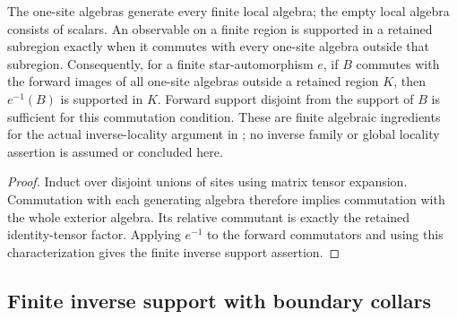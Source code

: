 \begin{lemma}
    \label{lem:mpu_singleton_generation_and_inverse_reflection}
    \leanok
    The one-site algebras generate every finite local algebra; the empty
    local algebra consists of scalars. An observable on a finite region
    is supported in a retained subregion exactly when it commutes with
    every one-site algebra outside that subregion. Consequently, for a
    finite star-automorphism $e$, if $B$ commutes with the forward images
    of all one-site algebras outside a retained region $K$, then
    $e^{-1}(B)$ is supported in $K$. Forward support disjoint from the
    support of $B$ is sufficient for this commutation condition. These
    are finite algebraic ingredients for the actual inverse-locality
    argument in \cite[lines~2292--2306]{Cirac2017MPU}; no inverse family
    or global locality assertion is assumed or concluded here.
\end{lemma}
\begin{proof}\leanok
    Induct over disjoint unions of sites using matrix tensor expansion.
    Commutation with each generating algebra therefore implies
    commutation with the whole exterior algebra. Its relative commutant
    is exactly the retained identity-tensor factor. Applying $e^{-1}$
    to the forward commutators and using this characterization gives
    the finite inverse support assertion.
\end{proof}

\subsection{Finite inverse support with boundary collars}

